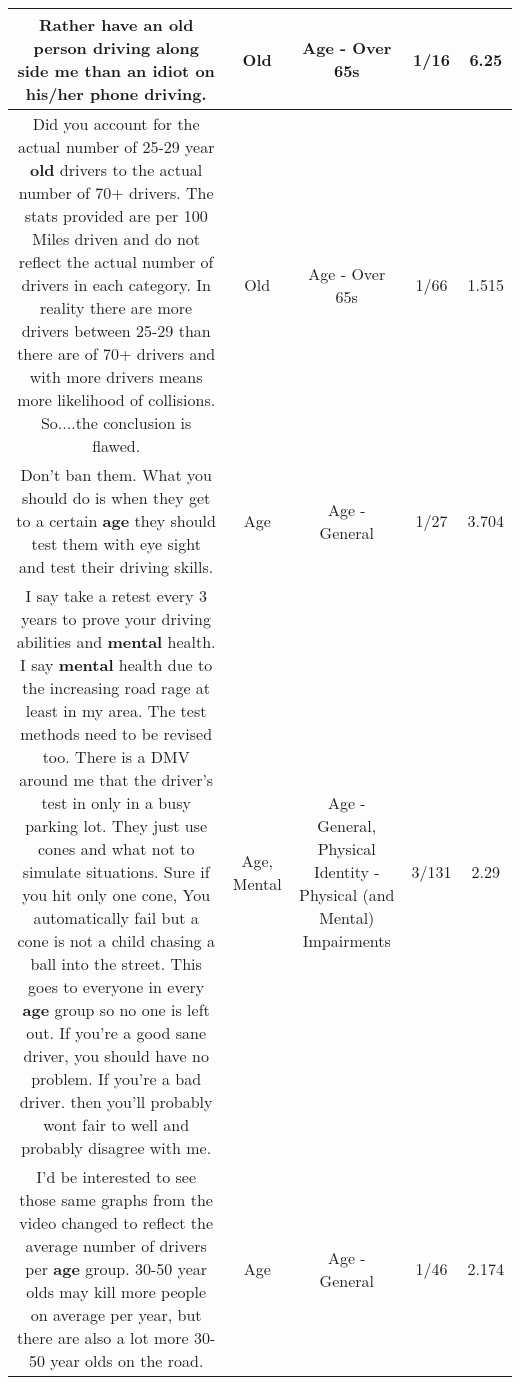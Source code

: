 \documentclass[11pt]{article}
\newlength\mylength
\begin{document}
\begin{center}
\begin{longtable}{|C{.65\mylength}|C{.30\mylength}|C{.12\mylength}|C{.12\mylength}|C{.12\mylength}|}
  \small Rather have an \textbf{old} person driving along side me than an idiot on his/her phone driving.\normalsize   & Old & Age - Over 65s & 1/16 & 6.25 \\  \hline
  \small Did you account for the actual number of 25-29 year \textbf{old} drivers to the actual number of 70+ drivers.  The stats provided are per 100 Miles driven and do not reflect the actual number of drivers in each category.  In reality there are more drivers between 25-29 than there are of 70+ drivers and with more drivers means more likelihood of collisions.  So....the conclusion is flawed.\normalsize   & Old & Age - Over 65s & 1/66 & 1.515 \\  \hline
  \small Don't ban them. What you should do is when they get to a certain \textbf{age} they should test them with eye sight and test their driving skills.\normalsize   & Age & Age - General & 1/27 & 3.704 \\  \hline
  \small I say take a retest every 3 years to prove your driving abilities and \textbf{mental} health. I say \textbf{mental} health due to the increasing road rage at least in my area. The test methods need to be revised too. There is a DMV around me that the driver's test in only in a busy parking lot. They just use cones and what not to simulate situations. Sure if you hit only one cone, You automatically fail but a cone is not a child chasing a ball into the street. This goes to everyone in every \textbf{age} group so no one is left out. If you're a good sane driver, you should have no problem. If you're a bad driver. then you'll probably wont fair to well and probably disagree with me.\normalsize   & Age, Mental & Age - General, Physical Identity - Physical (and Mental) Impairments & 3/131 & 2.29 \\  \hline
  \small I'd be interested to see those same graphs from the video changed to reflect the average number of drivers per \textbf{age} group. 30-50 year olds may kill more people on average per year, but there are also a lot more 30-50 year olds on the road.\normalsize   & Age & Age - General & 1/46 & 2.174 \\  \hline

\end{longtable}
\end{center}
\end{document}
